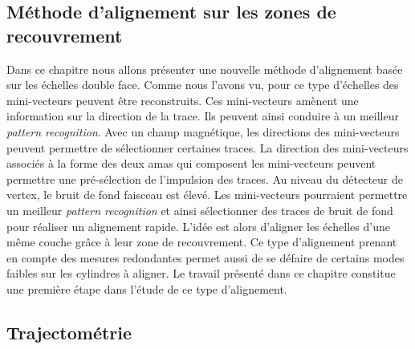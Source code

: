 %  
   
   \subsection{M\'ethode d'alignement sur les zones de recouvrement}
   
   Dans ce chapitre nous allons pr\'esenter une nouvelle m\'ethode d'alignement bas\'ee sur les \'echelles double face. Comme nous l'avons vu, pour ce type d'\'echelles des mini-vecteurs peuvent \^etre reconstruits. Ces mini-vecteurs am\`enent une information sur la direction de la trace. Ils peuvent ainsi conduire \`a un meilleur \textit{pattern recognition}. Avec un champ magn\'etique, les directions des mini-vecteurs peuvent permettre de sélectionner certaines traces. La direction des mini-vecteurs associ\'es \`a la forme des deux amas qui composent les mini-vecteurs peuvent permettre une pr\'e-s\'election de l'impulsion des traces. Au niveau du d\'etecteur de vertex, le bruit de fond faisceau est \'elev\'e. Les mini-vecteurs pourraient permettre un meilleur \textit{pattern recognition} et ainsi sélectionner des traces de bruit de fond pour réaliser un alignement rapide. L'id\'ee est alors d'aligner les \'echelles d'une m\^eme couche gr\^ace \`a leur zone de recouvrement. Ce type d'alignement prenant en compte des mesures redondantes permet aussi de se d\'efaire de certains modes faibles sur les cylindres \`a aligner. Le travail pr\'esent\'e dans ce chapitre constitue une premi\`ere \'etape dans l'\'etude de ce type d'alignement.
  
%   
   
 
   \subsection{Trajectom\'etrie}
   \label{sect:trajecto}
   
